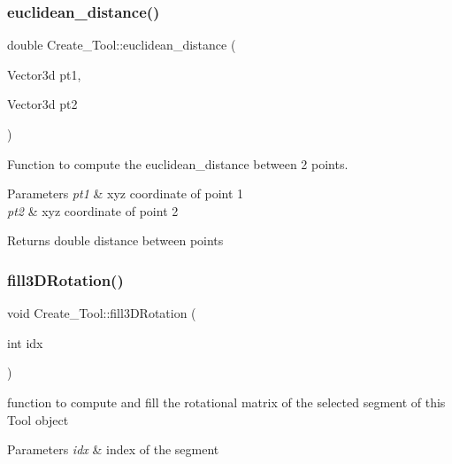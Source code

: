 \subsubsection{\texorpdfstring{euclidean\+\_\+distance()}{euclidean\_distance()}}
{\footnotesize\ttfamily double Create\+\_\+\+Tool\+::euclidean\+\_\+distance (\begin{DoxyParamCaption}\item[{Vector3d}]{pt1,  }\item[{Vector3d}]{pt2 }\end{DoxyParamCaption})\hspace{0.3cm}{\ttfamily [private]}}



Function to compute the euclidean\+\_\+distance between 2 points. 


\begin{DoxyParams}{Parameters}
{\em pt1} & xyz coordinate of point 1 \\
\hline
{\em pt2} & xyz coordinate of point 2 \\
\hline
\end{DoxyParams}
\begin{DoxyReturn}{Returns}
double distance between points 
\end{DoxyReturn}
\mbox{\label{classCreate__Tool_a271f74ac5f1fe45a0ee1069f42fbadaf}} 
\subsubsection{\texorpdfstring{fill3\+D\+Rotation()}{fill3DRotation()}}
{\footnotesize\ttfamily void Create\+\_\+\+Tool\+::fill3\+D\+Rotation (\begin{DoxyParamCaption}\item[{int}]{idx }\end{DoxyParamCaption})\hspace{0.3cm}{\ttfamily [private]}}



function to compute and fill the rotational matrix of the selected segment of this \textquotesingle{}Tool\textquotesingle{} object 


\begin{DoxyParams}{Parameters}
{\em idx} & index of the segment \\
\hline
\end{DoxyParams}
\mbox{\label{classCreate__Tool_ae2fa728fd141b1eea18ab82cb67c58de}} 
